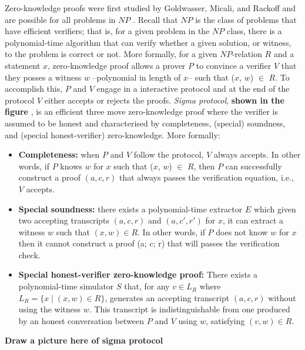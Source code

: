 \documentclass[conference,compsoc]{IEEEtran}
\begin{document}
Zero-knowledge proofs were first studied by Goldwasser, Micali, and Rackoff \cite{10.1145/22145.22178} and 
are possible for all problems in $NP$ \cite{10.1145/116825.116852}. Recall that $NP$ is the class of 
problems that have efficient verifiers; that is, for a given problem in the $NP$ class, there is 
a polynomial-time algorithm that can verify whether a given solution, or witness, to the problem is correct or not.
More formally, for a given $NP$-relation $R$ and a statement $x$, zero-knowledge proof allows a prover 
$P$ to convince a verifier $V$ that they posses a witness $w$ --polynomial in length of $x$-- such 
that ($x$, $w$) $\in$ $R$. To accomplish this, $P$ and $V$ engage in a 
interactive protocol and  at the end of the protocol $V$ either accepts or rejects the proofs.
\textit{Sigma protocol}, \textbf{shown in the figure }, is an efficient three move zero-knowledge proof where the 
verifier is assumed to be honest and characterised by completeness, (special) soundness, and 
(special honest-verifier) zero-knowledge. More formally: 
\begin{itemize}
  \item \textbf{Completeness:}
  when $P$ and $V$ follow the protocol, $V$ always accepts. 
  In other words, if $P$ knows $w$ for $x$ such that ($x$, $w$) $\in$ $R$,  
  then $P$ can successfully construct a proof $(a, c, r)$ that always passes the verification equation, 
  i.e., $V$ accepts. 

\item \textbf{Special soundness:}
there exists a polynomial-time extractor $E$ which given 
two accepting transcripts $(a, c, r)$ and $(a, c', r')$ for $x$, 
it can extract a witness $w$ such that $(x, w) \in R$. In other words, 
if $P$ does not know $w$ for $x$ then it cannot construct a proof 
(a; c; r) that will passes the verification check. 
\item \textbf{Special honest-verifier zero-knowledge proof:}
There exists a polynomial-time simulator $S$ that, for any 
$v \in L_R$ where $L_R = \{x  \mid (x, w) \in R\}$,
generates an accepting transcript $(a, c, r)$ 
without using the witness $w$. 
This transcript is indistinguishable from one produced by an 
honest conversation between $P$ and $V$ using $w$, 
satisfying $(v,w) \in R$.

\end{itemize}

\textbf{Draw a picture here of sigma protocol}
\end{document}
